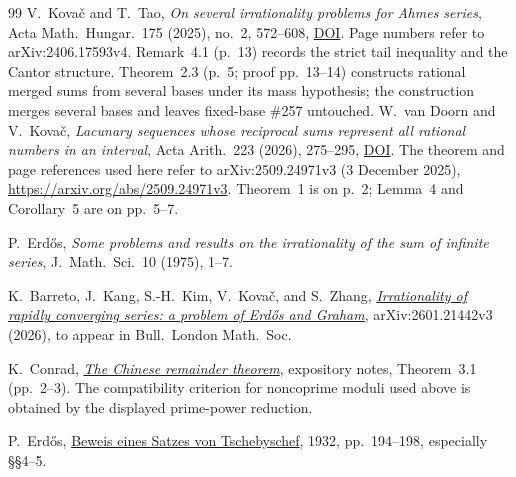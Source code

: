 \begin{thebibliography}{99}
 V.~Kova\v{c} and T.~Tao, \emph{On several irrationality
  problems for Ahmes series}, Acta Math.\ Hungar.\ 175 (2025), no.~2, 572--608,
  \href{https://doi.org/10.1007/s10474-025-01528-0}{DOI}.  Page numbers refer
  to arXiv:2406.17593v4.  Remark~4.1 (p.~13) records the strict tail
  inequality and the Cantor structure.  Theorem~2.3 (p.~5; proof pp.~13--14)
  constructs rational merged sums from several bases under its mass
  hypothesis; the construction merges several bases and leaves fixed-base \#257 untouched.
 W.~van Doorn and V.~Kova\v{c},
  \emph{Lacunary sequences whose reciprocal sums represent all rational
  numbers in an interval}, Acta Arith.\ 223 (2026), 275--295,
  \href{https://doi.org/10.4064/aa251001-13-1}{DOI}.
  The theorem and page references used here refer to
  arXiv:2509.24971v3 (3 December 2025),
  \url{https://arxiv.org/abs/2509.24971v3}.
  Theorem~1 is on p.~2; Lemma~4 and Corollary~5 are on pp.~5--7.

 P.~Erd\H{o}s, \emph{Some problems and results on the
  irrationality of the sum of infinite series}, J.~Math.\ Sci.\ 10 (1975),
  1--7.

 K.~Barreto, J.~Kang, S.-H.~Kim, V.~Kova\v{c}, and
  S.~Zhang, \href{https://arxiv.org/abs/2601.21442v3}{\emph{Irrationality of
  rapidly converging series: a problem of Erd\H{o}s and Graham}},
  arXiv:2601.21442v3 (2026), to appear in Bull.\ London Math.\ Soc.

 K.~Conrad,
  \href{https://kconrad.math.uconn.edu/blurbs/ugradnumthy/crt.pdf}
  {\emph{The Chinese remainder theorem}}, expository notes,
  Theorem~3.1 (pp.~2--3).  The compatibility criterion for noncoprime
  moduli used above is obtained by the displayed prime-power reduction.

 P.~Erd\H{o}s,
  \href{https://www.renyi.hu/~p_erdos/1932-01.pdf}
  {Beweis eines Satzes von Tschebyschef}, 1932, pp.~194--198,
  especially \S\S4--5.

\end{thebibliography}
